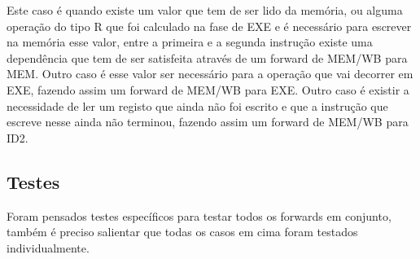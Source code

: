\documentclass[pdftex,12pt,a4paper]{report}
\begin{document}
\begin{table}[!htb]
\centering
\label{my-label}
\end{table}

Este caso é quando existe um valor que tem de ser lido da memória, ou alguma operação do tipo R que foi calculado na fase de EXE  e é necessário para escrever na memória esse valor, entre a primeira e a segunda instrução existe uma dependência que tem de ser satisfeita através de um forward de MEM/WB para MEM. Outro caso é esse valor ser necessário para a operação que vai decorrer em EXE, fazendo assim um forward de MEM/WB para EXE. Outro caso é existir a necessidade de ler um registo que ainda não foi escrito e que a instrução que escreve nesse ainda não terminou, fazendo assim um forward de MEM/WB para ID2.


\subsection{Testes}

Foram pensados testes específicos para testar todos os forwards em conjunto, também é preciso salientar que todas os casos em cima foram testados individualmente.
\end{document}
